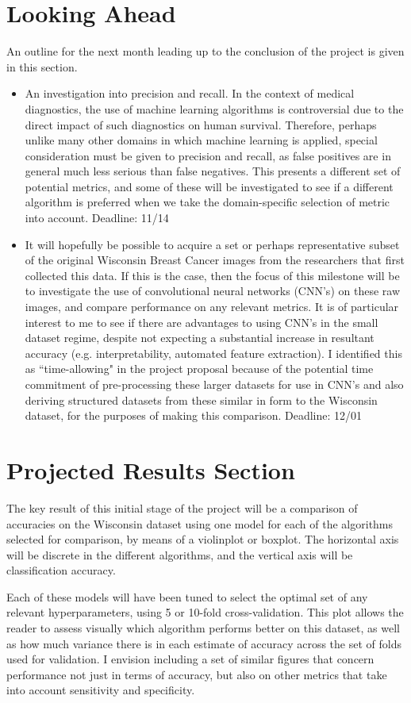 \documentclass[11pt]{article}
\begin{document}
\section{Looking Ahead}
An outline for the next month leading up to the conclusion of the project is given in this section.
\begin{itemize}
	\item An investigation into precision and recall. In the context of medical diagnostics, the use of machine learning algorithms is controversial due to the direct impact of such diagnostics on human survival. Therefore, perhaps unlike many other domains in which machine learning is applied, special consideration must be given to precision and recall, as false positives are in general much less serious than false negatives. This presents a different set of potential metrics, and some of these will be investigated to see if a different algorithm is preferred when we take the domain-specific selection of metric into account. Deadline: 11/14
	\item It will hopefully be possible to acquire a set or perhaps representative subset of the original Wisconsin Breast Cancer images from the researchers that first collected this data. If this is the case, then the focus of this milestone will be to investigate the use of convolutional neural networks (CNN's) on these raw images, and compare performance on any relevant metrics. It is of particular interest to me to see if there are advantages to using CNN's in the small dataset regime, despite not expecting a substantial increase in resultant accuracy (e.g. interpretability, automated feature extraction). I identified this as ``time-allowing" in the project proposal because of the potential time commitment of pre-processing these larger datasets for use in CNN's and also deriving structured datasets from these similar in form to the Wisconsin dataset, for the purposes of making this comparison. Deadline: 12/01
\end{itemize}

\section{Projected Results Section}
The key result of this initial stage of the project will be a comparison of accuracies on the Wisconsin dataset using one model for each of the algorithms selected for comparison, by means of a violinplot or boxplot. The horizontal axis will be discrete in the different algorithms, and the vertical axis will be classification accuracy.

Each of these models will have been tuned to select the optimal set of any relevant hyperparameters, using 5 or 10-fold cross-validation. This plot allows the reader to assess visually which algorithm performs better on this dataset, as well as how much variance there is in each estimate of accuracy across the set of folds used for validation. I envision including a set of similar figures that concern performance not just in terms of accuracy, but also on other metrics that take into account sensitivity and specificity.
\nocite{*}


\end{document}
